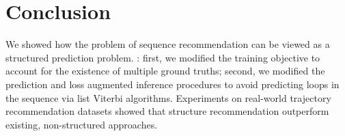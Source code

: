 
\secmoveup
\section{Conclusion}
\textmoveup

We showed how the problem of sequence recommendation
can be viewed as a structured prediction problem.
:
first, we modified the training objective to account for the existence of multiple ground truths;
second, we modified the prediction and loss augmented inference procedures to avoid predicting loops in the sequence via list Viterbi algorithms.
Experiments on real-world trajectory recommendation datasets showed that structure recommendation outperform existing, non-structured approaches. 

